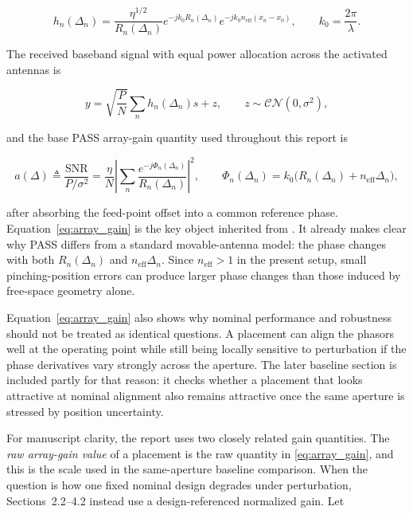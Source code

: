 \begin{equation}
h_n(\Delta_n)
= \frac{\eta^{1/2}}{R_n(\Delta_n)}
  e^{-j k_0 R_n(\Delta_n)}
  e^{-j k_0 n_{\mathrm{eff}} (x_n - x_0)},
\qquad
k_0 = \frac{2 \pi}{\lambda}.
\label{eq:channel}
\end{equation}

The received baseband signal with equal power allocation across the activated antennas is

\begin{equation}
y = \sqrt{\frac{P}{N}} \sum_n h_n(\Delta_n) s + z,
\qquad
z \sim \mathcal{CN}(0,\sigma^2),
\label{eq:rx}
\end{equation}

and the base PASS array-gain quantity used throughout this report is

\begin{equation}
a(\Delta)
\triangleq \frac{\mathrm{SNR}}{P/\sigma^2}
= \frac{\eta}{N}
  \left|
  \sum_n \frac{e^{-j \Phi_n(\Delta_n)}}{R_n(\Delta_n)}
  \right|^2,
\qquad
\Phi_n(\Delta_n) = k_0 \big(R_n(\Delta_n) + n_{\mathrm{eff}} \Delta_n\big),
\label{eq:array_gain}
\end{equation}

after absorbing the feed-point offset into a common reference phase. Equation~\eqref{eq:array_gain} is the key object inherited from \cite{ouyang2025array}. It already makes clear why PASS differs from a standard movable-antenna model: the phase changes with both $R_n(\Delta_n)$ and $n_{\mathrm{eff}}\Delta_n$. Since $n_{\mathrm{eff}} > 1$ in the present setup, small pinching-position errors can produce larger phase changes than those induced by free-space geometry alone.

Equation~\eqref{eq:array_gain} also shows why nominal performance and robustness should not be treated as identical questions. A placement can align the phasors well at the operating point while still being locally sensitive to perturbation if the phase derivatives vary strongly across the aperture. The later baseline section is included partly for that reason: it checks whether a placement that looks attractive at nominal alignment also remains attractive once the same aperture is stressed by position uncertainty.

For manuscript clarity, the report uses two closely related gain quantities. The \emph{raw array-gain value} of a placement is the raw quantity in \eqref{eq:array_gain}, and this is the scale used in the same-aperture baseline comparison. When the question is how one fixed nominal design degrades under perturbation, Sections~2.2--4.2 instead use a design-referenced normalized gain. Let

